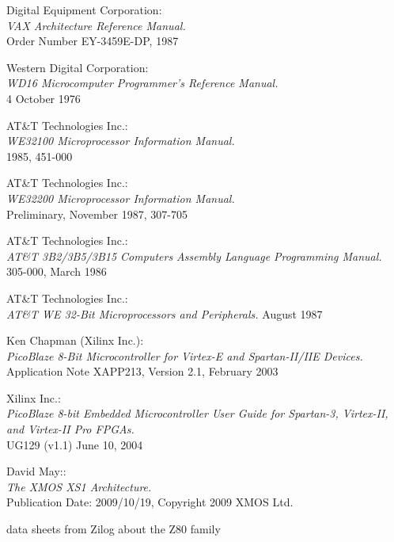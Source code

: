  Digital Equipment Corporation: \\
            {\em VAX Architecture Reference Manual.\/} \\
            Order Number EY-3459E-DP, 1987

 Western Digital Corporation: \\
            {\em WD16 Microcomputer Programmer's Reference Manual.\/} \\
            4 October 1976

 AT\&T Technologies Inc.: \\
            {\em WE32100 Microprocessor Information Manual.\/} \\
            1985, 451-000

 AT\&T Technologies Inc.: \\
            {\em WE32200 Microprocessor Information Manual.\/} \\
            Preliminary, November 1987, 307-705

 AT\&T Technologies Inc.: \\
            {\em AT\&T 3B2/3B5/3B15 Computers Assembly Language Programming Manual.\/} \\
            305-000, March 1986

 AT\&T Technologies Inc.: \\
            {\em AT\&T WE 32-Bit Microprocessors and Peripherals.\/}
            August 1987

 Ken Chapman (Xilinx Inc.):\\
                 {\em PicoBlaze 8-Bit Microcontroller for Virtex-E
                 and Spartan-II/IIE Devices.\/} \\
                 Application Note XAPP213, Version 2.1, February 2003

 Xilinx Inc.: \\
                 {\em PicoBlaze 8-bit Embedded Microcontroller User Guide
                 for Spartan-3, Virtex-II, and Virtex-II Pro FPGAs.\/} \\
                 UG129 (v1.1) June 10, 2004
                          
 David May:: \\
               {\em The XMOS XS1 Architecture.\/} \\
               Publication Date: 2009/10/19, Copyright 2009 XMOS Ltd.

 data sheets from Zilog about the Z80 family

